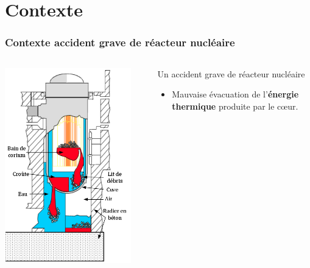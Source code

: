 \documentclass{beamer}
\begin{document}
\PageTitre{}




\section{Contexte}
\begin{frame}
    \frametitle{Contexte accident grave de réacteur nucléaire}
\begin{columns}[c]
        \begin{column}{0.4\textwidth}
            \includegraphics[width=0.9\textwidth]{Figures/accident_grave.png}
        \end{column}
\footnotesize
	\begin{column}{0.6\textwidth}
		\begin{ceablock}{Un accident grave de réacteur nucléaire}
			\begin{itemize}
				\item Mauvaise évacuation de l'\textbf{énergie thermique} produite par le cœur.

\end{itemize}
\end{ceablock}
\end{column}
\end{columns}
\end{frame}
\end{document}
